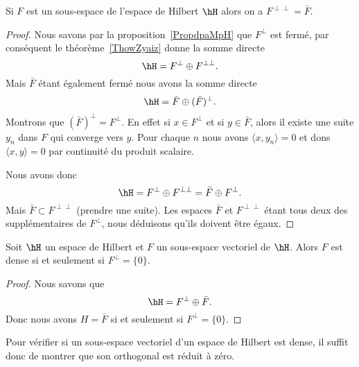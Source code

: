 \begin{proposition}
	Si \( F\) est un sous-espace de l'espace de Hilbert \( \hH\) alors on a \( F^{\perp\perp}=\bar F\).
\end{proposition}

\begin{proof}
	Nous savons par la proposition~\ref{PropdpaMpH} que \( F^{\perp}\) est fermé, par conséquent le théorème~\ref{ThowZyaiz} donne la somme directe
	\begin{equation}
		\hH=F^{\perp}\oplus F^{\perp\perp}.
	\end{equation}
	Mais \( \bar F\) étant également fermé nous avons la somme directe
	\begin{equation}
		\hH=\bar F\oplus(\bar F)^{\perp}.
	\end{equation}
	Montrons que \( (\bar F)^{\perp}=F^{\perp}\). En effet si \( x\in F^{\perp}\) et si \( y\in \bar F\), alors il existe une suite \( y_n\) dans \( F\) qui converge vers \( y\). Pour chaque \( n\) nous avons \( \langle x, y_n\rangle =0\) et dons \( \langle x, y\rangle =0\) par continuité du produit scalaire.

	Nous avons donc
	\begin{equation}
		\hH=F^{\perp}\oplus F^{\perp\perp}=\bar F\oplus F^{\perp}.
	\end{equation}
	Mais \( \bar F\subset F^{\perp\perp}\) (prendre une suite). Les espaces \( \bar F\) et \( F^{\perp\perp}\) étant tous deux des supplémentaires de \( F^{\perp}\), nous déduisons qu'ils doivent être égaux.
\end{proof}

\begin{proposition}     \label{PropqiWonByiBmc}
	Soit \( \hH\) un espace de Hilbert et \( F\) un sous-espace vectoriel de \( \hH\). Alors \( F\) est dense si et seulement si \( F^{\perp}=\{ 0 \}\).
\end{proposition}

\begin{proof}
	Nous savons que
	\begin{equation}
		\hH=F^{\perp}\oplus \bar F.
	\end{equation}
	Donc nous avons \( H=\bar F\) si et seulement si \( F^{\perp}=\{ 0 \}\).
\end{proof}
Pour vérifier si un sous-espace vectoriel d'un espace de Hilbert est dense, il suffit donc de montrer que son orthogonal est réduit à zéro.

